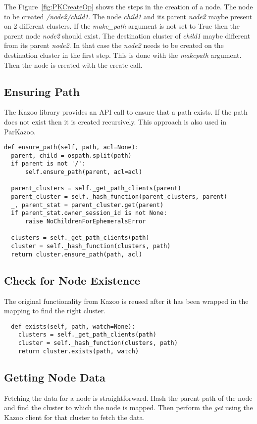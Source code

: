 The Figure~\ref{fig:PKCreateOp} shows the steps in the creation of a node. The node to be created \textit{/node2/child1}. The node \textit{child1} and its parent \textit{node2} maybe present on 2 different clusters. If the \textit{make\_path} argument is not set to True then the parent node \textit{node2} should exist. The destination cluster of \textit{child1} maybe different from its parent \textit{node2}. In that case the \textit{node2} needs to be created on the destination cluster in the first step. This is done with the \textit{makepath} argument. Then the node is created with the create call.

\subsection{Ensuring Path}
The Kazoo library provides an API call to ensure that a path exists. If the path does not exist then it is created recursively. This approach is also used in ParKazoo.

\begin{lstlisting}
def ensure_path(self, path, acl=None):
  parent, child = ospath.split(path)
  if parent is not '/':
      self.ensure_path(parent, acl=acl)

  parent_clusters = self._get_path_clients(parent)
  parent_cluster = self._hash_function(parent_clusters, parent)
  _, parent_stat = parent_cluster.get(parent)
  if parent_stat.owner_session_id is not None:
      raise NoChildrenForEphemeralsError

  clusters = self._get_path_clients(path)
  cluster = self._hash_function(clusters, path)
  return cluster.ensure_path(path, acl)
\end{lstlisting}

\subsection{Check for Node Existence}
The original functionality from Kazoo is reused after it has been wrapped in the mapping to find the right cluster.

\begin{lstlisting}
  def exists(self, path, watch=None):
    clusters = self._get_path_clients(path)
    cluster = self._hash_function(clusters, path)
    return cluster.exists(path, watch)
\end{lstlisting}

\subsection{Getting Node Data}
Fetching the data for a node is straightforward. Hash the parent path of the node and find the cluster to which the node is mapped. Then perform the \textit{get} using the Kazoo client for that cluster to fetch the data.

